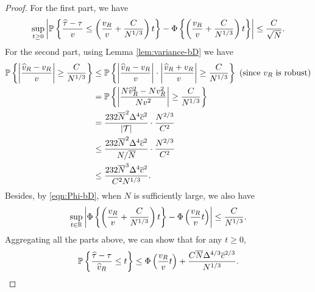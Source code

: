 \documentclass[12pt]{article}
\begin{document}
\begin{proof}
{    For the first part, we have
    \begin{align*}
        \sup_{t\ge 0}\left|{\mathbb{P}}\left\{\frac{{\widehat{\tau}} - \tau}{{v}}   \le \left(\frac{{v}_R}{v} + \frac{C}{N^{1/3}}\right)t\right\} - \Phi\left\{\left(\frac{{v}_R}{v} + \frac{C}{N^{1/3}}\right)t \right\}\right| \le \frac{C}{\sqrt{N}}.
    \end{align*}
    For the second part, using Lemma \ref{lem:variance-bD} we have
    \begin{align*}
        {\mathbb{P}}\left\{ \left|\frac{\widehat{v}_R - v_R}{v}\right| \ge \frac{C}{N^{{1}/{3}}}\right\} &\le  {\mathbb{P}}\left\{ \left|\frac{\widehat{v}_R - v_R}{v}\right|\cdot\left|\frac{\widehat{v}_R + v_R}{v}\right| \ge \frac{C}{N^{{1}/{3}}}\right\} \text{ (since $v_R$ is robust)}\\
        & =  {\mathbb{P}}\left\{ \left|\frac{N\widehat{v}^2_R - Nv^2_R}{Nv^2}\right| \ge \frac{C}{N^{{1}/{3}}}\right\}  \\
        & = \frac{232\overline{N}^2\Delta^4\overline{c}^2}{|{\mathcal{T}}|}\cdot\frac{N^{2/3}}{C^2} \\
        & \le \frac{232\overline{N}^2\Delta^4\overline{c}^2}{N/\overline{N}}\cdot\frac{N^{2/3}}{C^2} \\
        & \le \frac{232\overline{N}^3\Delta^4\overline{c}^2}{C^2N^{1/3}}.
    \end{align*}
    Besides, by \eqref{eqn:Phi-bD}, when $N$ is sufficiently large, we also have
    \begin{align*}
        \sup_{t\in{\mathbb{R}}}\left|\Phi\left\{\left(\frac{{v}_R}{v} + \frac{C}{N^{1/3}}\right)t \right\} - \Phi\left(\frac{v_R}{v}t\right)\right| \le \frac{C}{N^{1/3}}. 
    \end{align*}
    Aggregating all the parts above, we can show that for any $t\ge 0$,
    \begin{align*}
        {\mathbb{P}}\left\{\frac{{\widehat{\tau}} - \tau}{\widehat{v}_R} \le t\right\} \le \Phi\left(\frac{v_R}{v}t\right) + \frac{C\overline{N}\Delta^{4/3}\overline{c}^{2/3}}{N^{1/3}}.
    \end{align*}
    
}
\end{proof}
\end{document}
